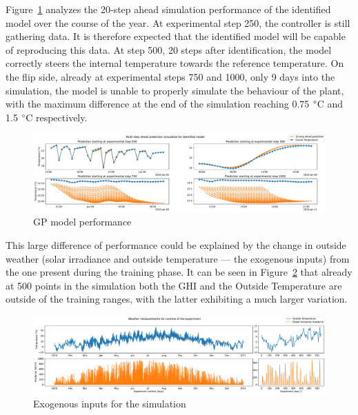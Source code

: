 Figure~\ref{fig:GP_first_model_performance} analyzes the 20-step ahead
simulation performance of the identified model over the course of the year. At
experimental step 250, the controller is still gathering data. It is therefore
expected that the identified model will be capable of reproducing this data. At
step 500, 20 steps after identification, the model correctly steers the internal
temperature towards the reference temperature. On the flip side, already at
experimental steps 750 and 1000, only 9 days into the simulation, the model is
unable to properly simulate the behaviour of the plant, with the maximum
difference at the end of the simulation reaching 0.75 $\degree$C and 1.5
$\degree$C respectively.

\begin{figure}[ht]
    \centering
    \includegraphics[width =
    \textwidth]{Plots/4_GP_480pts_12_averageYear_first_model_performance.pdf}
    \caption{GP model performance}
    \label{fig:GP_first_model_performance}
\end{figure}

This large difference of performance could be explained by the change in outside
weather (solar irradiance and outside temperature --- the exogenous inputs) from
the one present during the training phase. It can be seen in
Figure~\ref{fig:Dataset_outside_temperature} that already at 500 points in the
simulation both the GHI and the Outside Temperature are outside of the training
ranges, with the latter exhibiting a much larger variation. 


\begin{figure}[ht]
    \centering
    \includegraphics[width =
    \textwidth]{Plots/Exogenous_inputs_fullyear.pdf}
    \caption{Exogenous inputs for the simulation}
    \label{fig:Dataset_outside_temperature}
\end{figure}

